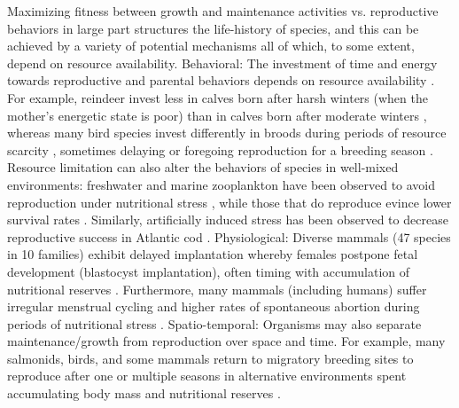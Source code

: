 \documentclass[12pt,english]{article}
\begin{document}
\begin{spacing}{1.9}
Maximizing fitness between growth and maintenance activities vs. reproductive behaviors in large part structures the life-history of species, and this can be achieved by a variety of potential mechanisms all of which, to some extent, depend on resource availability.
Behavioral: The investment of time and energy towards reproductive and parental behaviors depends on resource availability \citep{Morris:1987eo}.
For example, reindeer invest less in calves born after harsh winters (when the mother's energetic state is poor) than in calves born after moderate winters \citep{Tveraa:2003fq}, whereas many bird species invest differently in broods during periods of resource scarcity \citep{Daan:1988va,Jacot:2009dv}, sometimes delaying or foregoing reproduction for a breeding season \citep{Barboza:2002in}.
Resource limitation can also alter the behaviors of species in well-mixed environments: freshwater and marine zooplankton have been observed to avoid reproduction under nutritional stress \citep{Threlkeld:1976ih}, while those that do reproduce evince lower survival rates \citep{Kirk:1997cc}.
Similarly, artificially induced stress has been observed to decrease reproductive success in Atlantic cod \citep{Morgan:1999do}.
Physiological: Diverse mammals (47 species in 10 families) exhibit delayed implantation whereby females postpone fetal development (blastocyst implantation), often timing with accumulation of nutritional reserves \citep{Mead:1989dt,Sandell:1990kw}. %
Furthermore, many mammals (including humans) suffer irregular menstrual cycling and higher rates of spontaneous abortion during periods of nutritional stress \citep{Bulik:1999eo,Trites:2003cc}.
Spatio-temporal: Organisms may also separate maintenance/growth from reproduction over space and time. 
For example, many salmonids, birds, and some mammals return to migratory breeding sites to reproduce after one or multiple seasons in alternative environments spent accumulating body mass and nutritional reserves \citep{Weber:1998jg,Mduma:1999cp,Moore:2014hi}.

\end{spacing}
\end{document}
